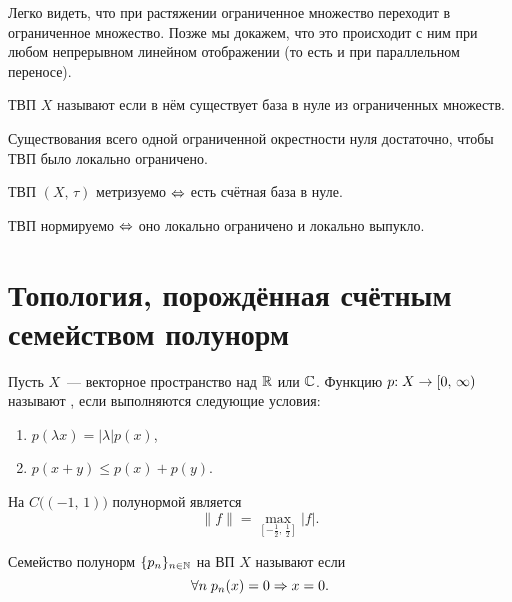 \documentclass{notes}
\begin{document}
	\begin{st}
		Легко видеть, что при растяжении ограниченное множество переходит в ограниченное множество. Позже мы докажем, что это происходит с ним при любом непрерывном линейном отображении (то есть и при параллельном переносе).
	\end{st}

	\begin{de}
		ТВП $X$ называют  если в нём существует база в нуле из ограниченных множеств.
	\end{de}

	\begin{st}
		Существования всего одной ограниченной окрестности нуля достаточно, чтобы ТВП было локально ограничено.
	\end{st}

	\begin{thm}
		ТВП $(X, \, \tau)$ метризуемо $\Leftrightarrow$ есть счётная база в нуле. 
	\end{thm}

	\begin{thm}[Колмогоров]
		ТВП нормируемо $\Leftrightarrow$ оно локально ограничено и локально выпукло.
	\end{thm}

\section{Топология, порождённая счётным семейством полунорм}

	\begin{de}
		Пусть $X$~--- векторное пространство над $\mathbb{R}$ или $\mathbb{C}$. Функцию 
		$p\text{\text{:}} \; X \to [0, \, \infty)$ называют , если выполняются следующие условия:
		\begin{enumerate}
			\item $p(\lambda x) = |\lambda| p(x)$,
			\item $p(x + y) \leqslant p(x) + p(y)$.
		\end{enumerate}
	\end{de}

	\begin{exm}
		На $C\big((-1, \, 1)\big)$ полунормой является
		\[
			\|f\| = \max\limits_{\left[-\tfrac{1}{2}, \, \tfrac{1}{2}\right]} |f|.
		\]
	\end{exm}

	\begin{de}
		Семейство полунорм $\{p_n\}_{n \in \mathbb{N}}$ на ВП $X$ называют  если 
		\[
			\forall n \; p_n(x) = 0 \Rightarrow x = 0.
		\] 
	\end{de}
\end{document}
